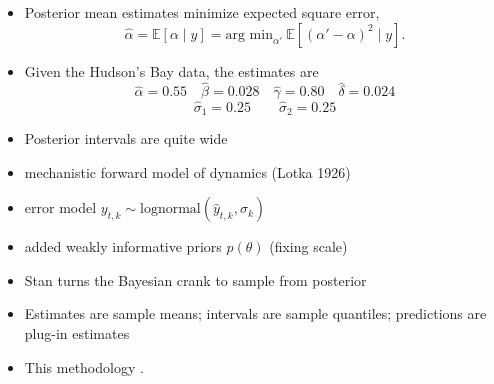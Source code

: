 \documentclass[9pt]{report}
\begin{document}

\begin{itemize}
\item Posterior mean estimates minimize expected square error,
  \[
    \hat{\alpha} = \mathbb{E}[\alpha \mid y]
    = \textrm{arg min}_{\alpha'} \ \mathbb{E}[(\alpha' - \alpha)^2 \mid
    y].
  \]
\item Given the Hudson's Bay data, the estimates are
  \[
    \hat{\alpha} = 0.55
    \quad
    \hat{\beta} = 0.028
    \quad
    \hat{\gamma} = 0.80
    \quad
    \hat{\delta} = 0.024
  \]
  \[
    \hat{\sigma}_1 = 0.25 \qquad \hat{\sigma}_2 = 0.25
  \]
  \item Posterior intervals are quite wide
  \end{itemize}

\begin{itemize}
\item mechanistic forward model of dynamics (Lotka 1926)
\item error model $y_{t,k} \sim \textrm{lognormal}(\hat{y}_{t,k}, \sigma_k)$
\item added weakly informative priors $p(\theta)$ (fixing scale) 
\item Stan turns the Bayesian crank to sample from posterior
\item Estimates are sample means; intervals are sample quantiles;
  predictions are plug-in estimates
\item This methodology .
\end{itemize}
\end{document}
